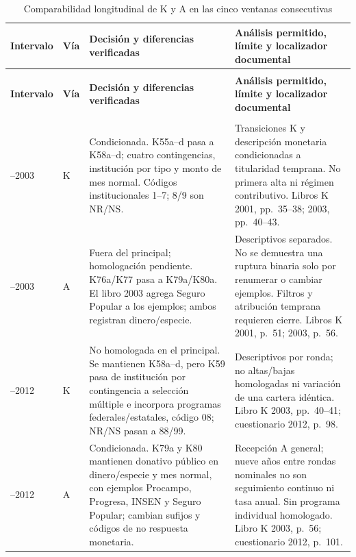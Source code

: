 \begingroup
\small\singlespacing
\setlength{\parskip}{0pt}
\setlength{\tabcolsep}{3pt}
\renewcommand{\arraystretch}{1.16}
\begin{longtable}{@{}>{\raggedright\arraybackslash}p{1.9cm}>{\raggedright\arraybackslash}p{.8cm}>{\raggedright\arraybackslash}p{6.1cm}>{\raggedright\arraybackslash}p{6.1cm}@{}}
\caption{Comparabilidad longitudinal de K y A en las cinco ventanas consecutivas}
\label{tab:comparabilidad-ventanas}\\
\toprule
\textbf{Intervalo} & \textbf{Vía} & \textbf{Decisión y diferencias verificadas} & \textbf{Análisis permitido, límite y localizador documental}\\
\midrule
\endfirsthead
\multicolumn{4}{l}{\small Cuadro \thetable\ (continuación)}\\
\toprule
\textbf{Intervalo} & \textbf{Vía} & \textbf{Decisión y diferencias verificadas} & \textbf{Análisis permitido, límite y localizador documental}\\
\midrule
\endhead
\midrule\multicolumn{4}{r}{\small Continúa en la página siguiente}\\
\endfoot
\bottomrule
\endlastfoot
2001--2003 & K & Condicionada. K55a--d pasa a K58a--d; cuatro contingencias, institución por tipo y monto de mes normal. Códigos institucionales 1--7; 8/9 son NR/NS. & Transiciones K y descripción monetaria condicionadas a titularidad temprana. No primera alta ni régimen contributivo. Libros K 2001, pp.~35--38; 2003, pp.~40--43. \\
\addlinespace[3pt]
2001--2003 & A & Fuera del principal; homologación pendiente. K76a/K77 pasa a K79a/K80a. El libro 2003 agrega Seguro Popular a los ejemplos; ambos registran dinero/especie. & Descriptivos separados. No se demuestra una ruptura binaria solo por renumerar o cambiar ejemplos. Filtros y atribución temprana requieren cierre. Libros K 2001, p.~51; 2003, p.~56. \\
\addlinespace[3pt]
2003--2012 & K & No homologada en el principal. Se mantienen K58a--d, pero K59 pasa de institución por contingencia a selección múltiple e incorpora programas federales/estatales, código 08; NR/NS pasan a 88/99. & Descriptivos por ronda; no altas/bajas homologadas ni variación de una cartera idéntica. Libro K 2003, pp.~40--41; cuestionario 2012, p.~98. \\
\addlinespace[3pt]
2003--2012 & A & Condicionada. K79a y K80 mantienen donativo público en dinero/especie y mes normal, con ejemplos Procampo, Progresa, INSEN y Seguro Popular; cambian sufijos y códigos de no respuesta monetaria. & Recepción A general; nueve años entre rondas nominales no son seguimiento continuo ni tasa anual. Sin programa individual homologado. Libro K 2003, p.~56; cuestionario 2012, p.~101. \\

\end{longtable}
